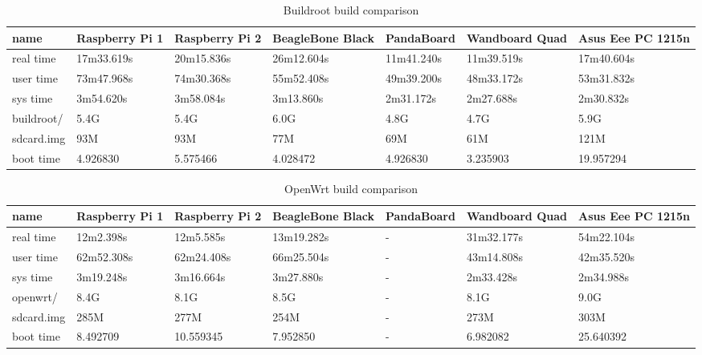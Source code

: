 \documentclass[printmode]{mgr}
\begin{document}
\begin{landscape}



\begin{table}
  \begin{tabular}{| p{2.5cm} | p{3cm} | p{3cm} | p{3cm} | p{3cm} | p{3cm} | p{3cm} |}
    \hline
    name & Raspberry Pi 1 & Raspberry Pi 2 & BeagleBone Black & PandaBoard & Wandboard Quad & Asus Eee PC 1215n \\
    \hline
    real time & 17m33.619s & 20m15.836s & 26m12.604s & 11m41.240s & 11m39.519s & 17m40.604s \\
    \hline
    user time & 73m47.968s & 74m30.368s & 55m52.408s & 49m39.200s & 48m33.172s & 53m31.832s \\
    \hline
    sys time & 3m54.620s & 3m58.084s & 3m13.860s & 2m31.172s & 2m27.688s & 2m30.832s \\
    \hline
    buildroot/ & 5.4G & 5.4G & 6.0G & 4.8G & 4.7G & 5.9G \\
    \hline
    sdcard.img & 93M & 93M & 77M & 69M & 61M & 121M \\
    \hline
    boot time & 4.926830 & 5.575466 & 4.028472 & 4.926830 & 3.235903 & 19.957294 \\
    \hline
  \end{tabular}
  \caption{Buildroot build comparison}
\end{table}


\begin{table}
  \begin{tabular}{| p{2.5cm} | p{3cm} | p{3cm} | p{3cm} | p{3cm} | p{3cm} | p{3cm} |}
    \hline
    name & Raspberry Pi 1 & Raspberry Pi 2 & BeagleBone Black & PandaBoard & Wandboard Quad & Asus Eee PC 1215n \\
    \hline
    real time & 12m2.398s & 12m5.585s & 13m19.282s & - & 31m32.177s & 54m22.104s \\
    \hline
    user time & 62m52.308s & 62m24.408s & 66m25.504s & - & 43m14.808s & 42m35.520s \\
    \hline
    sys time & 3m19.248s & 3m16.664s & 3m27.880s & - & 2m33.428s & 2m34.988s \\
    \hline
    openwrt/ & 8.4G & 8.1G & 8.5G & - & 8.1G & 9.0G \\
    \hline
    sdcard.img & 285M & 277M & 254M & - & 273M & 303M \\
    \hline
    boot time & 8.492709 & 10.559345 & 7.952850 & - & 6.982082 & 25.640392 \\
    \hline
  \end{tabular}
  \caption{OpenWrt build comparison}
\end{table}





\end{landscape}
\end{document}

